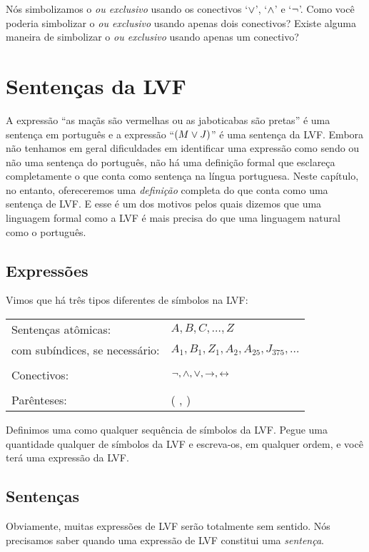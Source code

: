 \problempart
Nós simbolizamos o \emph{ou exclusivo} usando os conectivos `$\vee$', `$\wedge$' e `$\neg$'.
Como você poderia simbolizar o \emph{ou exclusivo} usando apenas dois conectivos?
Existe alguma maneira de simbolizar o \emph{ou exclusivo} usando apenas um conectivo?


\chapter{Sentenças da LVF}\label{s:TFLSentences}
A expressão ``as maçãs são vermelhas ou as jaboticabas são pretas'' é uma sentença em português e a expressão ``$(M \vee J)$'' é uma sentença da LVF.
Embora não tenhamos em geral dificuldades em identificar uma expressão como sendo ou não uma sentença do português, não há uma definição formal que esclareça completamente o que conta como sentença na língua portuguesa.
Neste capítulo, no entanto, ofereceremos uma \emph{definição} completa do que conta como uma sentença de LVF.
E esse é um dos motivos pelos quais dizemos que uma linguagem formal como a LVF é mais precisa do que uma linguagem natural como o português.


\section{Expressões}

Vimos que há três tipos diferentes de símbolos na LVF:
\begin{center}
\begin{tabular}{l l}
Sentenças atômicas: & $A,B,C,\ldots,Z$\\
com subíndices, se necessário: & $A_1, B_1,Z_1,A_2,A_{25},J_{375},\ldots$\\
\\
Conectivos: & $\neg,\wedge,\vee,\rightarrow,\leftrightarrow$\\
\\
Parênteses: &( , )\\
\end{tabular}
\end{center}
Definimos uma  como qualquer sequência de símbolos da LVF.
Pegue uma quantidade qualquer de símbolos da LVF e escreva-os, em qualquer ordem, e você terá uma expressão da LVF.


\section{Sentenças}\label{s:Sentences}
Obviamente, muitas expressões de LVF serão totalmente sem sentido.
Nós precisamos saber quando uma expressão de LVF constitui uma \emph{sentença}.

